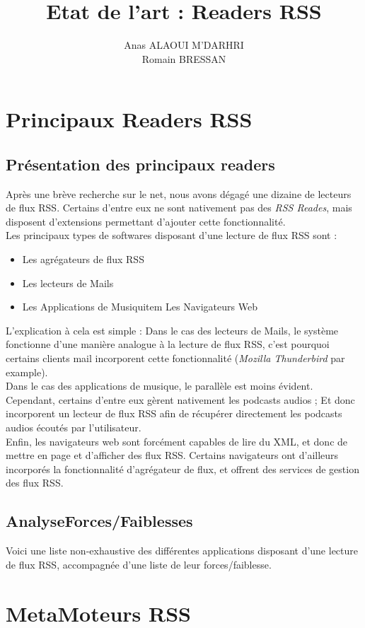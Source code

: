 \documentclass{article}
\title{Etat de l'art : Readers RSS}
\author{Anas ALAOUI M'DARHRI\\
Romain BRESSAN}
\begin{document}
\maketitle
\section{Principaux Readers RSS}
\subsection{Présentation des principaux readers}
Après une brève recherche sur le net, nous avons dégagé une dizaine de lecteurs de flux RSS. Certains d'entre eux ne sont nativement pas des \textit{RSS Reades}, mais disposent d'extensions permettant d'ajouter cette fonctionnalité. \\
Les principaux types de softwares disposant d'une lecture de flux RSS sont : 
\begin{itemize}
    \item Les agrégateurs de flux RSS 
    \item Les lecteurs de Mails 
    \item Les Applications de Musiquitem Les Navigateurs Web
\end{itemize}
L'explication à cela est simple : Dans le cas des lecteurs de Mails, le système fonctionne d'une manière analogue à la lecture de flux RSS, c'est pourquoi certains clients mail incorporent cette fonctionnalité (\textit{Mozilla Thunderbird} par example). \\
Dans le cas des applications de musique, le parallèle est moins évident. Cependant, certains d'entre eux gèrent nativement les podcasts audios ; Et donc incorporent un lecteur de flux RSS afin de récupérer directement les podcasts audios écoutés par l'utilisateur. \\
Enfin, les navigateurs web sont forcément capables de lire du XML, et donc de mettre en page et d'afficher des flux RSS. Certains navigateurs ont d'ailleurs incorporés la fonctionnalité d'agrégateur de flux, et offrent des services de gestion des flux RSS.\\
\subsection{AnalyseForces/Faiblesses}
Voici une liste non-exhaustive des différentes applications disposant d'une lecture de flux RSS, accompagnée d'une liste de leur forces/faiblesse.
\section{MetaMoteurs RSS}
\end{document}
